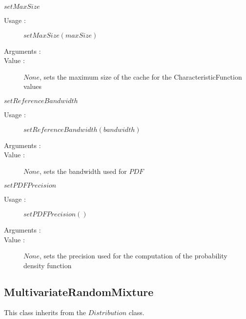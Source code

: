 \begin{description}
\begin{description}
  \item $setMaxSize$
    \begin{description}
    \item[Usage :]  $setMaxSize(maxSize)$
    \item[Arguments :]  \strut
    \item[Value :] $None$, sets the maximum size of the cache for the CharacteristicFunction values
    \end{description}

  \item $setReferenceBandwidth$
    \begin{description}
    \item[Usage :]  $setReferenceBandwidth(bandwidth)$
    \item[Arguments :] \strut
    \item[Value :] $None$, sets the bandwidth used for $PDF$
    \end{description}

  \item $setPDFPrecision$
    \begin{description}
    \item[Usage :]  $setPDFPrecision()$
    \item[Arguments :]  \strut
    \item[Value :] $None$, sets the precision used for the computation of the probability density function
    \end{description}

  \end{description}

\end{description}

\subsection{MultivariateRandomMixture}
This class inherits from the $Distribution$ class.

